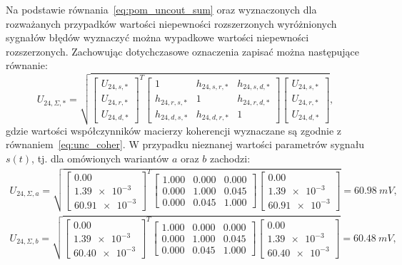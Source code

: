 Na podstawie równania~\eqref{eq:pom_uncout_sum} oraz wyznaczonych dla rozważanych przypadków wartości niepewności rozszerzonych wyróżnionych sygnałów błędów wyznaczyć można wypadkowe wartości niepewności rozszerzonych. Zachowując dotychczasowe oznaczenia zapisać można następujące równanie:
\begin{equation}
U_{24,\Sigma,*} = \sqrt{
\begin{bmatrix}
U_{24,s,*} \\ U_{24,r,*} \\ U_{24,d,*}
\end{bmatrix}^{T}
\begin{bmatrix}
1            & h_{24,s,r,*} & h_{24,s,d,*} \\
h_{24,r,s,*} &            1 & h_{24,r,d,*} \\
h_{24,d,s,*} & h_{24,d,r,*} &            1
\end{bmatrix}
\begin{bmatrix}
U_{24,s,*} \\ U_{24,r,*} \\ U_{24,d,*}
\end{bmatrix}}
\label{eq:pom_mono_all_unc_opt},
\end{equation}
gdzie wartości współczynników macierzy koherencji wyznaczane są zgodnie z równaniem~\eqref{eq:unc_coher}. W przypadku nieznanej wartości parametrów sygnału $s(t)$, tj. dla omówionych wariantów $a$ oraz $b$ zachodzi:
\begin{gather}
U_{24,\Sigma,a} = \sqrt{
\begin{bmatrix}
\num{0.00} \\ \num{1.39e-3} \\ \num{60.91e-3}
\end{bmatrix}^{T}
\begin{bmatrix}
\num{1.000} & \num{0.000} & \num{0.000} \\
\num{0.000} & \num{1.000} & \num{0.045} \\
\num{0.000} & \num{0.045} & \num{1.000}
\end{bmatrix}
\begin{bmatrix}
\num{0.00} \\ \num{1.39e-3} \\ \num{60.91e-3}
\end{bmatrix}} = \qty{60.98}{mV}
\label{eq:pom_mono_all_unc_a}, \\
U_{24,\Sigma,b} =  \sqrt{
\begin{bmatrix}
\num{0.00} \\ \num{1.39e-3} \\ \num{60.40e-3}
\end{bmatrix}^{T}
\begin{bmatrix}
\num{1.000} & \num{0.000} & \num{0.000} \\
\num{0.000} & \num{1.000} & \num{0.045} \\
\num{0.000} & \num{0.045} & \num{1.000}
\end{bmatrix}
\begin{bmatrix}
\num{0.00} \\ \num{1.39e-3} \\ \num{60.40e-3}
\end{bmatrix}} = \qty{60.48}{mV}
\label{eq:pom_mono_all_unc_b},
\end{gather}
